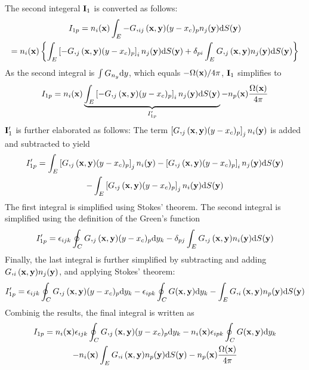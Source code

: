 The second integeral ${\bf I}_1$ is converted as follows:
%
\begin{multline}
	I_{1p}
	= n_i({\bf x}) \int_E -G,_{ij}({\bf x}, {\bf y}) 
	(y - x_c)_p
	n_j({\bf y})
	\mathrm{d} S({\bf y}) \\
	= n_i({\bf x})
	\left\{ \int_E \left[-G,_{j}({\bf x}, {\bf y}) 
	(y - x_c)_p\right]_i
	n_j({\bf y})
	\mathrm{d} S({\bf y})
	+
	\delta_{pi}
	\int_E G,_{j}({\bf x}, {\bf y}) 
	n_j({\bf y})
	\mathrm{d} S({\bf y})
	\right\}
\end{multline}
%
As the second integral is $\int G_{n_y} \mathrm{d} y$, which equals $-\Omega({\bf x})/4\pi$, ${\bf I}_1$ simplifies to
%
\begin{equation}
	I_{1p}
	= 
	n_i({\bf x})
	\underbrace{\int_E
	\left[-G,_{j}({\bf x}, {\bf y}) 
	(y - x_c)_p\right]_i
	n_j({\bf y})
	\mathrm{d} S({\bf y})}_{I'_{1p}}
	-
	n_p({\bf x})
	\frac{\Omega({\bf x})}{4\pi}
\end{equation}
%
${\bf I}'_1$ is further elaborated as follows: The term $\left[G,_{j}({\bf x}, {\bf y}) (y - x_c)_p\right]_j n_i({\bf y})$ is added and subtracted to yield
%
\begin{multline}
	I'_{1p} = 
	\int_E
		\left[G,_{j}({\bf x}, {\bf y}) (y - x_c)_p\right]_j
		n_i({\bf y})
		-
		\left[G,_{j}({\bf x}, {\bf y}) (y - x_c)_p\right]_i
		n_j({\bf y})
	\mathrm{d} S({\bf y}) \\
	-
	\int_E
	\left[G,_{j}({\bf x}, {\bf y}) (y - x_c)_p\right]_j
	n_i({\bf y})
	\mathrm{d} S({\bf y})
\end{multline}
%
The first integral is simplified using Stokes' theorem. The second integral is simplified using the definition of the Green's function
%
\begin{equation}
	I'_{1p} = 
	\epsilon_{ijk}
	\oint_C
	G,_{j}({\bf x}, {\bf y}) (y - x_c)_p
	\mathrm{d} y_k
	-
	\delta_{pj}
	\int_E
		G,_{j}({\bf x}, {\bf y})
		n_i({\bf y})
	\mathrm{d} S({\bf y})
\end{equation}
%
Finally, the last integral is further simplified by subtracting and adding $G,_{i}({\bf x}, {\bf y}) n_j({\bf y})$, and applying Stokes' theorem:
%
\begin{equation}
	I'_{1p} = 
	\epsilon_{ijk}
	\oint_C
	G,_{j}({\bf x}, {\bf y}) (y - x_c)_p
	\mathrm{d} y_k
	-
	\epsilon_{ipk}
	\oint_C
		G({\bf x}, {\bf y})
	\mathrm{d} y_k
	-
	\int_E
		G,_{i}({\bf x}, {\bf y}) n_p({\bf y})
	\mathrm{d} S({\bf y})
\end{equation}
%
Combinig the results, the final integral is written as
%
\begin{multline}
	I_{1p} = 
	n_i({\bf x})
	\epsilon_{ijk}
	\oint_C
	G,_{j}({\bf x}, {\bf y}) (y - x_c)_p
	\mathrm{d} y_k
	-
	n_i({\bf x})
	\epsilon_{ipk}
	\oint_C
		G({\bf x}, {\bf y})
	\mathrm{d} y_k \\
	-
	n_i({\bf x})
	\int_E
		G,_{i}({\bf x}, {\bf y}) n_p({\bf y})
	\mathrm{d} S({\bf y})
	-
	n_p({\bf x}) \frac{\Omega({\bf x})}{4\pi}
\end{multline}
